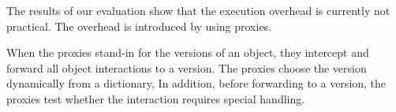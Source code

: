 




The results of our evaluation show that the execution overhead is currently not practical.
The overhead is introduced by using proxies.





When the proxies stand-in for the versions of an object, they intercept and forward all object interactions to a version.
The proxies choose the version dynamically from a dictionary,
In addition, before forwarding to a version, the proxies test whether the interaction requires special handling.












